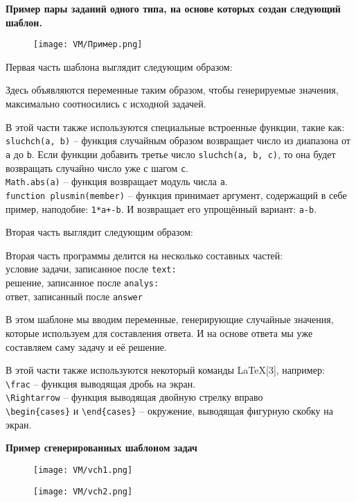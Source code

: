 \textbf{Пример пары заданий одного типа, на основе которых создан следующий шаблон. } 

\begin{figure}[h]
		\centering
		\texttt{[image: VM/Пример.png]}
\label{ris:image}
\end{figure}

Первая часть шаблона выглядит следующим образом:



Здесь объявляются переменные таким образом, чтобы генерируемые значения,  максимально соотносились с исходной задачей.

В этой части также используются специальные встроенные функции, такие как:
\\ \texttt{sluchch(a, b)} – функция случайным образом возвращает число из диапазона от \texttt{a} до \texttt{b}. Если функции добавить третье число \texttt{sluchch(a, b, с)}, то она будет возвращать случайно число уже с шагом \texttt{с}.
\\ \texttt{Math.abs(a)} – функция возвращает модуль числа \texttt{a}.
\\ \texttt{function plusmin(member)} – функция принимает аргумент, содержащий в себе пример, наподобие: \texttt{1*a+-b}. И возвращает его упрощённый вариант: \texttt{a-b}.

Вторая часть выглядит следующим образом:



Вторая часть программы делится на несколько составных частей:
\\ условие задачи, записанное после \texttt{text:}
\\ решение, записанное после \texttt{analys:}
\\ ответ, записанный после \texttt{answer}

В этом шаблоне мы вводим переменные, генерирующие случайные значения, которые используем для составления ответа. И на основе ответа мы уже составляем саму задачу и её решение.

В этой части также используются некоторый команды \LaTeX[3], например:
\\ \texttt{\textbackslash frac} – функция выводящая дробь на экран.
\\ \texttt{\textbackslash Rightarrow} – функция выводящая двойную стрелку вправо
\\ \texttt{\textbackslash begin\{cases\}} и \texttt{\textbackslash end\{cases\}} – окружение, выводящая фигурную скобку на экран.

\textbf{ Пример сгенерированных шаблоном задач}

 	\begin{figure}[h]
		\centering
		\texttt{[image: VM/vch1.png]}
		 		\end{figure}
		 	\begin{figure}[h]
		\centering
		\texttt{[image: VM/vch2.png]}
	\end{figure}
